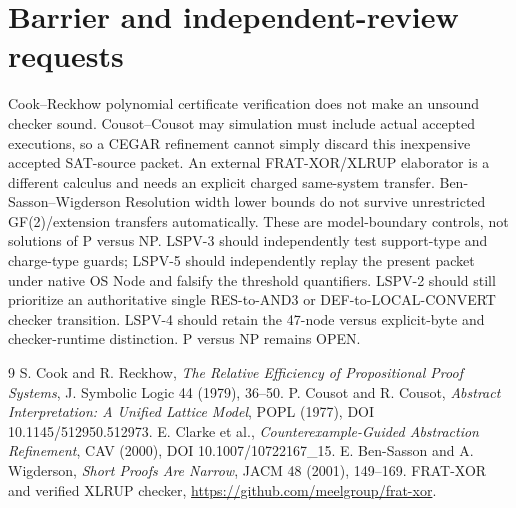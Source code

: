 \documentclass[11pt]{article}
\begin{document}
\section*{Barrier and independent-review requests}
Cook--Reckhow polynomial certificate verification does not
make an unsound checker sound. Cousot--Cousot may simulation
must include actual accepted executions, so a CEGAR refinement
cannot simply discard this inexpensive accepted SAT-source
packet. An external FRAT-XOR/XLRUP elaborator is a different
calculus and needs an explicit charged same-system transfer.
Ben-Sasson--Wigderson Resolution width lower bounds do not
survive unrestricted GF(2)/extension transfers automatically.
These are model-boundary controls, not solutions of P versus NP.
LSPV-3 should independently test support-type and charge-type
guards; LSPV-5 should independently replay the present packet
under native OS Node and falsify the threshold quantifiers.
LSPV-2 should still prioritize an authoritative single
RES-to-AND3 or DEF-to-LOCAL-CONVERT checker transition.
LSPV-4 should retain the 47-node versus explicit-byte and
checker-runtime distinction. P versus NP remains OPEN.

\begin{thebibliography}{9}
 S. Cook and R. Reckhow,
\emph{The Relative Efficiency of Propositional Proof Systems},
J. Symbolic Logic 44 (1979), 36--50.
 P. Cousot and R. Cousot,
\emph{Abstract Interpretation: A Unified Lattice Model},
POPL (1977), DOI 10.1145/512950.512973.
 E. Clarke et al.,
\emph{Counterexample-Guided Abstraction Refinement},
CAV (2000), DOI 10.1007/10722167\_15.
 E. Ben-Sasson and A. Wigderson,
\emph{Short Proofs Are Narrow}, JACM 48 (2001), 149--169.
 FRAT-XOR and verified XLRUP checker,
\url{https://github.com/meelgroup/frat-xor}.
\end{thebibliography}
\end{document}
